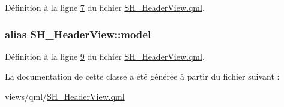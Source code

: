 Définition à la ligne \hyperlink{SH__HeaderView_8qml_source_l00007}{7} du fichier \hyperlink{SH__HeaderView_8qml_source}{S\-H\-\_\-\-Header\-View.\-qml}.

\hypertarget{classSH__HeaderView_abf76f87214384e86fb9413047287161d}{
\subsubsection[{model}]{\setlength{\rightskip}{0pt plus 5cm}alias S\-H\-\_\-\-Header\-View\-::model}}\label{classSH__HeaderView_abf76f87214384e86fb9413047287161d}


Définition à la ligne \hyperlink{SH__HeaderView_8qml_source_l00009}{9} du fichier \hyperlink{SH__HeaderView_8qml_source}{S\-H\-\_\-\-Header\-View.\-qml}.



La documentation de cette classe a été générée à partir du fichier suivant \-:\begin{DoxyCompactItemize}
\item 
views/qml/\hyperlink{SH__HeaderView_8qml}{S\-H\-\_\-\-Header\-View.\-qml}\end{DoxyCompactItemize}
